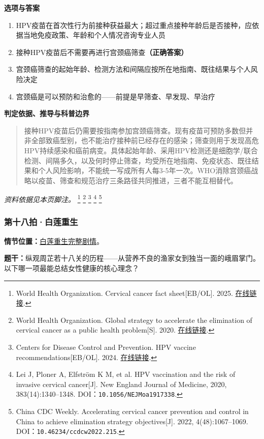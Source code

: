 \textbf{选项与答案}
\begin{enumerate}[label=\Alph*.,leftmargin=*]
  \item HPV疫苗在首次性行为前接种获益最大；超过重点接种年龄后是否接种，应依据当地免疫政策、年龄和个人情况咨询专业人员
  \item 接种HPV疫苗后不需要再进行宫颈癌筛查\textbf{（正确答案）}
  \item 宫颈癌筛查的起始年龄、检测方法和间隔应按所在地指南、既往结果与个人风险决定
  \item 宫颈癌是可以预防和治愈的——前提是早筛查、早发现、早治疗
\end{enumerate}
\textbf{判定依据、推导与科普边界}
\begin{quote}接种HPV疫苗后仍需要按指南参加宫颈癌筛查。现有疫苗可预防多数但并非全部致癌型别，也不能治疗接种前已经存在的感染；筛查则用于发现高危HPV持续感染和癌前病变。具体起始年龄、采用HPV检测还是细胞学/联合检测、间隔多久，以及何时停止筛查，均受所在地指南、免疫状态、既往结果和个人风险影响，不能统一写成所有人每3-5年一次。WHO消除宫颈癌战略以疫苗、筛查和规范治疗三条路径共同推进，三者不能互相替代。\end{quote}
\noindent\textit{资料依据见本页脚注。}
\footnote{World Health Organization. Cervical cancer fact sheet[EB/OL]. 2025. \href{https://www.who.int/news-room/fact-sheets/detail/cervical-cancer}{在线链接}.}
\footnote{World Health Organization. Global strategy to accelerate the elimination of cervical cancer as a public health problem[S]. 2020. \href{https://www.who.int/publications/i/item/9789240014107}{在线链接}.}
\footnote{Centers for Disease Control and Prevention. HPV vaccine recommendations[EB/OL]. 2024. \href{https://www.cdc.gov/hpv/hcp/vaccination-considerations/index.html}{在线链接}.}
\footnote{Lei J, Ploner A, Elfström K M, et al. HPV vaccination and the risk of invasive cervical cancer[J]. New England Journal of Medicine, 2020, 383(14):1340–1348. DOI：\nolinkurl{10.1056/NEJMoa1917338}.}
\footnote{China CDC Weekly. Accelerating cervical cancer prevention and control in China to achieve elimination strategy objectives[J]. 2022, 4(48):1067–1069. DOI：\nolinkurl{10.46234/ccdcw2022.215}.}

\subsubsection{第十八拍·白莲重生}\label{question:zhouzhiruo:18}
\textbf{情节位置：}\hyperref[plot:zhouzhiruo:18]{白莲重生完整剧情}。

\textbf{题干：}纵观周芷若十八关的历程——从营养不良的渔家女到独当一面的峨眉掌门。以下哪一项最能总结女性健康的核心理念？


